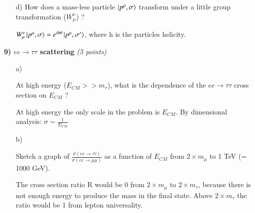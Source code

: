 {\begin{itemize}
$\Lambda_\mu^\nu \ket{p^\mu,\sigma} = e^{ih\theta} \ket{\Lambda p,\sigma'}$, where h is the particles helicity.

\item[d)] How does a mass-less particle $\ket{p^\mu,\sigma}$ transform under a little group transformation ($W_\mu^\nu$)  ?

$W_\mu^\nu \ket{p^\mu,\sigma} = e^{ih\theta} \ket{p^\mu,\sigma'}$, where h is the particles helicity.

\end{itemize}

\vspace*{0.3in}

\textbf{9) $ee\rightarrow\tau\tau$ scattering } \hfill \textit{(5 points)}\\
\begin{itemize}
\item[a)]{
At high energy ($E_{CM} >> m_\tau$), what is the dependence of the $ee\rightarrow\tau\tau$ cross section on $E_{CM}$ ?

At high energy the only scale in the problem is $E_{CM}$.  By dimensional analysis:
$\sigma \sim \frac{1}{E_{CM}}$

}


\item[b)]{
Sketch a graph of $\frac{\sigma(ee\rightarrow\tau\tau)}{\sigma(ee\rightarrow\mu\mu)}$ as a function of $E_{CM}$ from $2\times m_{\mu}$ to 1 TeV (= 1000 GeV).

The cross section ratio R would be 0 from $2\times m_{\mu}$ to $2\times m_{\tau}$, because there is not enough energy to produce the mass in the final state.
Above $2\times m_{\tau}$ the ratio would be 1 from lepton universality.

}
\end{itemize}





\vspace*{0.3in}

}
